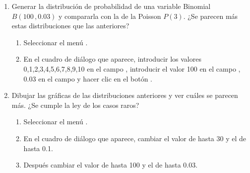 \begin{enumerate}[leftmargin=*]
\begin{enumerate}
\item Generar la distribución de probabilidad de una variable Binomial $B(100\,,0.03)$ y compararla con la de la
Poisson $P(3)$. ¿Se parecen más estas distribuciones que las anteriores? 
\begin{indicacion}{
\begin{enumerate}
\item Seleccionar el menú .
\item En el cuadro de diálogo que aparece, introducir los valores 0,1,2,3,4,5,6,7,8,9,10 en el campo , introducir el valor 100 en el campo , $0.03$ en
el campo  y hacer clic en el botón .
\end{enumerate}}
\end{indicacion}

\item Dibujar las gráficas de las distribuciones anteriores y ver cuáles se parecen más. 
¿Se cumple la ley de los casos raros?
\begin{indicacion}{
\begin{enumerate}
\item Seleccionar el menú .
\item En el cuadro de diálogo que aparece, cambiar el valor de  hasta 30 y el de  hasta 0.1.
\item Después cambiar el valor de  hasta 100 y el de  hasta 0.03.
\end{enumerate}}
\end{indicacion}
\end{enumerate}
\end{enumerate}


